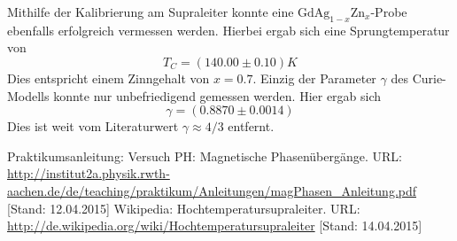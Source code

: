 \documentclass{../Misc/MontavonLaTeX/Montavon}
\newcommand{\gdagzn}{$\textrm{GdAg}_{1-x}\textrm{Zn}_x$}
\begin{document}
Mithilfe der Kalibrierung am Supraleiter konnte eine \gdagzn-Probe ebenfalls erfolgreich vermessen werden. Hierbei ergab sich eine Sprungtemperatur von 
\[
	T_C = (140.00 \pm 0.10) \unit{K}
\]
Dies entspricht einem Zinngehalt von $x = 0.7$.
Einzig der Parameter $\gamma$ des Curie-Modells konnte nur unbefriedigend gemessen werden. Hier ergab sich 
\[
	\gamma = (0.8870 \pm 0.0014)
\]
Dies ist weit vom Literaturwert $\gamma \approx 4/3$ entfernt.

\newpage
\begin{thebibliography}{xxxx}
 Praktikumsanleitung: Versuch PH: Magnetische Phasenübergänge. URL: \url{http://institut2a.physik.rwth-aachen.de/de/teaching/praktikum/Anleitungen/magPhasen_Anleitung.pdf} [Stand: 12.04.2015]
 Wikipedia: Hochtemperatursupraleiter. URL: \url{http://de.wikipedia.org/wiki/Hochtemperatursupraleiter} [Stand: 14.04.2015]
\end{thebibliography}
\end{document}
